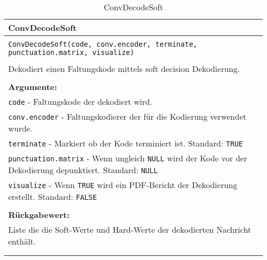 \begin{longtable}{|p{\textwidth}|}
\hline
\rowcolor{lightblue}
ConvDecodeSoft
\\
\hline
\\
\texttt{ConvDecodeSoft(code, conv.encoder, terminate, punctuation.matrix, visualize)}\\
\\
Dekodiert einen Faltungskode mittels soft decision Dekodierung.\\
\\
\textbf{Argumente:}\\
\texttt{code} - Faltungskode der dekodiert wird.\\
\texttt{conv.encoder} - Faltungskodierer der für die Kodierung verwendet wurde.\\
\texttt{terminate} - Markiert ob der Kode terminiert ist. Standard: \texttt{TRUE}\\
\texttt{punctuation.matrix} - Wenn ungleich \texttt{NULL} wird der Kode vor der Dekodierung depunktiert. Standard: \texttt{NULL}\\
\texttt{visualize} - Wenn \texttt{TRUE} wird ein PDF-Bericht der Dekodierung erstellt. Standard: \texttt{FALSE}\\
\\
\textbf{Rückgabewert:}\\
Liste die die Soft-Werte und Hard-Werte der dekodierten Nachricht enthält.\\
\\
\hline
\caption{ConvDecodeSoft}
\end{longtable}